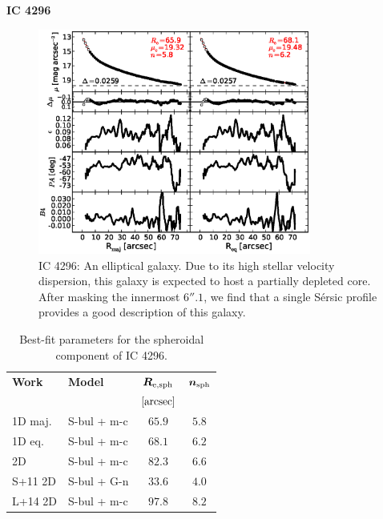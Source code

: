 \documentclass[preprint2]{emulateapj}
\newcommand{\fitfigurewidth}{0.8\textwidth}
\begin{document}
  \clearpage\newpage\noindent
  {\bf IC 4296 \\}

  \begin{figure}[h]
  \begin{center}
  \includegraphics[width=\fitfigurewidth]{ic4296_1Dfit.eps}
  \caption{IC 4296:
  An elliptical galaxy. 
  Due to its high stellar velocity dispersion, this galaxy is expected to host a partially depleted core. 
  After masking the innermost $6''.1$, 
  we find that a single S\'ersic profile provides a good description of this galaxy.}
  \end{center}
  \end{figure}

  \begin{table}[h]
  \small
  \caption{Best-fit parameters for the spheroidal component of IC 4296.}
  \begin{center}
  \begin{tabular}{llcc}
  \hline
  {\bf Work} & {\bf Model}   & $\bm R_{\rm e,sph}$    & $\bm n_{\rm sph}$ \\
    &  &  $[\rm arcsec]$ & \\
  \hline
  1D maj. & S-bul + m-c & $65.9$  &  $5.8$ \\
  1D eq.  & S-bul + m-c & $68.1$  &  $6.2$ \\
  2D      & S-bul + m-c & $82.3$  &  $6.6$ \\
  \hline
  S+11 2D         & S-bul + G-n & $33.6$  &  $4.0$ \\
  L+14 2D         & S-bul + m-c & $97.8$  &  $8.2$ \\
  \hline
  \end{tabular}
  \end{center}
  \label{tab:ic4296}
  \end{table}
\end{document}

